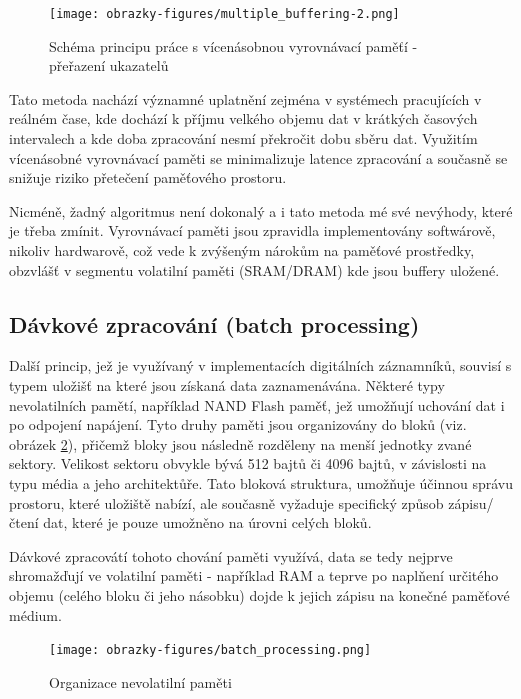 \begin{figure}[h]
    \centering
    \texttt{[image: obrazky-figures/multiple\_buffering-2.png]}
    
    \caption{Schéma principu práce s vícenásobnou vyrovnávací paměťí - přeřazení ukazatelů}
    \label{fig:multiple-buffering-2}
\end{figure}

Tato metoda nachází významné uplatnění zejména v systémech pracujících v reálném čase, kde dochází k příjmu velkého objemu dat v krátkých časových intervalech a kde doba zpracování nesmí 
překročit dobu sběru dat. Využitím vícenásobné vyrovnávací paměti se minimalizuje latence zpracování a současně se snižuje riziko přetečení paměťového prostoru. \cite{buffering_chang}

Nicméně, žadný algoritmus není dokonalý a i tato metoda mé své nevýhody, které je třeba zmínit. Vyrovnávací paměti jsou zpravidla implementovány softwárově, nikoliv hardwarově, což vede 
k zvýšeným nárokům na paměťové prostředky, obzvlášť v segmentu volatilní paměti (SRAM/DRAM) kde jsou buffery uložené. \cite{basics_of_digital_forensics}

\subsection{Dávkové zpracování (batch processing)}
Další princip, jež je využívaný v implementacích digitálních záznamníků, souvisí s typem uložišť na které jsou získaná data zaznamenávána. Některé typy nevolatilních pamětí, například 
NAND Flash paměť, jež umožňují uchování dat i po odpojení napájení. Tyto druhy paměti jsou organizovány do bloků (viz. obrázek \ref{fig:batch-processing}), přičemž bloky jsou následně 
rozděleny na menší jednotky zvané sektory. Velikost sektoru obvykle bývá 512 bajtů či 4096 bajtů, v závislosti na typu média a jeho architektůře. Tato bloková struktura, umožňuje účinnou 
správu prostoru, které uložiště nabízí, ale současně vyžaduje specifický způsob zápisu/čtení dat, které je pouze umožněno na úrovni celých bloků.  \cite{tech_target_nand_flash, non_volatile_memories}

Dávkové zpracovátí tohoto chování paměti využívá, data se tedy nejprve shromažďují ve volatilní paměti - například RAM a teprve po naplňení určitého objemu (celého bloku či jeho násobku) 
dojde k jejich zápisu na konečné paměťové médium.

\begin{figure}[h]
    \centering
    \texttt{[image: obrazky-figures/batch\_processing.png]}
    
    \caption{Organizace nevolatilní paměti}
    \label{fig:batch-processing}
\end{figure}


